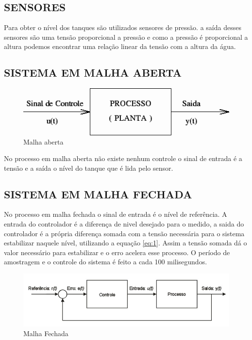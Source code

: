 \documentclass[a4paper,12pt]{article}
\begin{document}
\subsection{SENSORES}
\hspace{4ex}Para obter o nível dos tanques são utilizados sensores de pressão. a saída desses sensores são uma tensão proporcional a pressão e como a pressão é proporcional a altura podemos encontrar uma relação linear da tensão com a altura da água.


\subsection{SISTEMA EM MALHA ABERTA}
\begin{figure}[H]
\includegraphics[width=15cm]{malhaAberta.png}
\caption{Malha aberta}
\label{fig:malhaAberta}
\end{figure}
\hspace{4ex}No processo em malha aberta não existe nenhum controle o sinal de entrada é a tensão e a saída o nível do tanque que é lida pelo sensor.


\subsection{SISTEMA EM MALHA FECHADA}
\hspace{4ex}No processo em malha fechada o sinal de entrada é o nível de referência.
A entrada do controlador é a diferença de nivel desejado para o medido, a saida do controlador é a própria diferença somada com a tensão necessária para o sistema estabilizar naquele nível, utilizando a equação \ref{eq:1}.
Assim a tensão somada dá o valor necessário para estabilizar e o erro acelera esse processo.
O período de amostragem e o controle do sistema é feito a cada 100 milisegundos.


\begin{figure}[H]
\includegraphics[width=15cm]{malhaFechada.jpg}
\caption{Malha Fechada}
\label{fig:malhaFechada}
\end{figure}
\end{document}
